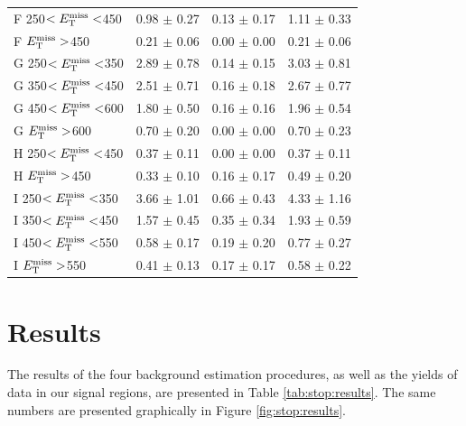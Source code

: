 \begin{table}[htbp]
\begin{tabular}{|l|cc|c|}
 F 250$<E_\text{T}^\text{miss}<$450 & 0.98 $\pm$ 0.27   & 0.13 $\pm$ 0.17   & 1.11 $\pm$ 0.33   \\
 F $E_\text{T}^\text{miss}>$450 & 0.21 $\pm$ 0.06   & 0.00 $\pm$ 0.00   & 0.21 $\pm$ 0.06   \\
 G 250$<E_\text{T}^\text{miss}<$350 & 2.89 $\pm$ 0.78   & 0.14 $\pm$ 0.15   & 3.03 $\pm$ 0.81   \\
 G 350$<E_\text{T}^\text{miss}<$450 & 2.51 $\pm$ 0.71   & 0.16 $\pm$ 0.18   & 2.67 $\pm$ 0.77   \\
 G 450$<E_\text{T}^\text{miss}<$600 & 1.80 $\pm$ 0.50   & 0.16 $\pm$ 0.16   & 1.96 $\pm$ 0.54   \\
 G $E_\text{T}^\text{miss}>$600 & 0.70 $\pm$ 0.20   & 0.00 $\pm$ 0.00   & 0.70 $\pm$ 0.23   \\
 H 250$<E_\text{T}^\text{miss}<$450 & 0.37 $\pm$ 0.11   & 0.00 $\pm$ 0.00   & 0.37 $\pm$ 0.11   \\
 H $E_\text{T}^\text{miss}>$450 & 0.33 $\pm$ 0.10   & 0.16 $\pm$ 0.17   & 0.49 $\pm$ 0.20   \\
 I 250$<E_\text{T}^\text{miss}<$350 & 3.66 $\pm$ 1.01   & 0.66 $\pm$ 0.43   & 4.33 $\pm$ 1.16   \\
 I 350$<E_\text{T}^\text{miss}<$450 & 1.57 $\pm$ 0.45   & 0.35 $\pm$ 0.34   & 1.93 $\pm$ 0.59   \\
 I 450$<E_\text{T}^\text{miss}<$550 & 0.58 $\pm$ 0.17   & 0.19 $\pm$ 0.20   & 0.77 $\pm$ 0.27   \\
 I $E_\text{T}^\text{miss}>$550 & 0.41 $\pm$ 0.13   & 0.17 $\pm$ 0.17   & 0.58 $\pm$ 0.22   \\
\hline
\end{tabular}
\end{table}

\section{Results}
\label{sec:stop:results}

The results of the four background estimation procedures, as well as
the yields of data in our signal regions, are presented in Table
\ref{tab:stop:results}. The same numbers are presented graphically in
Figure \ref{fig:stop:results}.


